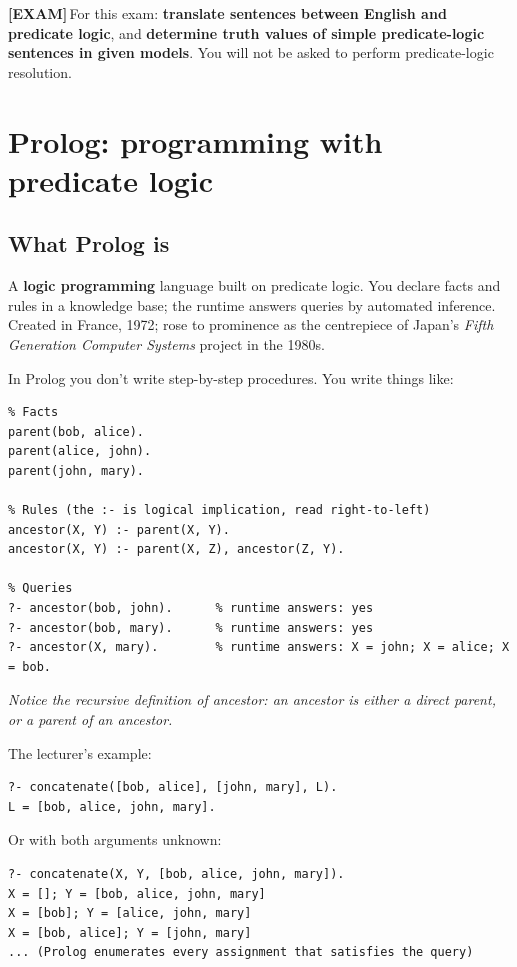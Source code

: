 \documentclass[11pt, a4paper]{article}
\newcommand{\examflag}{\textcolor{tipBd}{\textbf{[EXAM]}}\,}
\begin{document}
\examflag{}For this exam: \textbf{translate sentences between English and predicate logic}, and \textbf{determine truth values of simple predicate-logic sentences in given models}. You will not be asked to perform predicate-logic resolution.

\section{Prolog: programming with predicate logic}

\subsection{What Prolog is}

\begin{defbox}[Prolog]
A \textbf{logic programming} language built on predicate logic. You declare facts and rules in a knowledge base; the runtime answers queries by automated inference. Created in France, 1972; rose to prominence as the centrepiece of Japan's \emph{Fifth Generation Computer Systems} project in the 1980s.
\end{defbox}

In Prolog you don't write step-by-step procedures. You write things like:

\begin{exbox}
\begin{verbatim}
% Facts
parent(bob, alice).
parent(alice, john).
parent(john, mary).

% Rules (the :- is logical implication, read right-to-left)
ancestor(X, Y) :- parent(X, Y).
ancestor(X, Y) :- parent(X, Z), ancestor(Z, Y).

% Queries
?- ancestor(bob, john).      % runtime answers: yes
?- ancestor(bob, mary).      % runtime answers: yes
?- ancestor(X, mary).        % runtime answers: X = john; X = alice; X = bob.
\end{verbatim}
\textit{Notice the recursive definition of ancestor: an ancestor is either a direct parent, or a parent of an ancestor.}
\end{exbox}

The lecturer's example:
\begin{verbatim}
?- concatenate([bob, alice], [john, mary], L).
L = [bob, alice, john, mary].
\end{verbatim}

Or with both arguments unknown:
\begin{verbatim}
?- concatenate(X, Y, [bob, alice, john, mary]).
X = []; Y = [bob, alice, john, mary]
X = [bob]; Y = [alice, john, mary]
X = [bob, alice]; Y = [john, mary]
... (Prolog enumerates every assignment that satisfies the query)
\end{verbatim}
\end{document}
